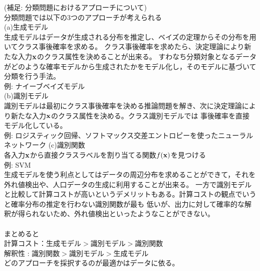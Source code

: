 \documentclass{jsarticle}
\begin{document}
(補足: 分類問題におけるアプローチについて) \\
分類問題では以下の3つのアプローチが考えられる \\
(a)生成モデル \\
生成モデルはデータが生成される分布を推定し、ベイズの定理からその分布を用いてクラス事後確率を求める。
クラス事後確率を求めたら、決定理論により新たな入力$\bf x$のクラス属性を決めることが出来る。
すわなち分類対象となるデータがどのような確率モデルから生成されたかをモデル化し，そのモデルに基づいて分類を行う手法。\\
例: ナイーブベイズモデル \\
(b)識別モデル \\
識別モデルは最初にクラス事後確率を決める推論問題を解き、次に決定理論により新たな入力$\bf x$のクラス属性を決める。クラス識別モデルでは
事後確率を直接モデル化している。 \\
例: ロジスティック回帰、ソフトマックス交差エントロピーを使ったニューラルネットワーク
(c)識別関数 \\
各入力$\bf x$から直接クラスラベルを割り当てる関数$f(\bf x)$を見つける \\
例: SVM
\\
生成モデルを使う利点としてはデータの周辺分布を求めることができて，それを外れ値検出や、人口データの生成に利用することが出来る。
一方で識別モデルと比較して計算コストが高いというデメリットもある。計算コストの観点でいうと確率分布の推定を行わない識別関数が最も
低いが、出力に対して確率的な解釈が得られないため、外れ値検出といったようなことができない。\\
\\
まとめると \\
計算コスト：$生成モデル > 識別モデル > 識別関数$ \\
解釈性 : $識別関数 > 識別モデル > 生成モデル$ \\
どのアプローチを採択するのが最適かはデータに依る。
\end{document}
